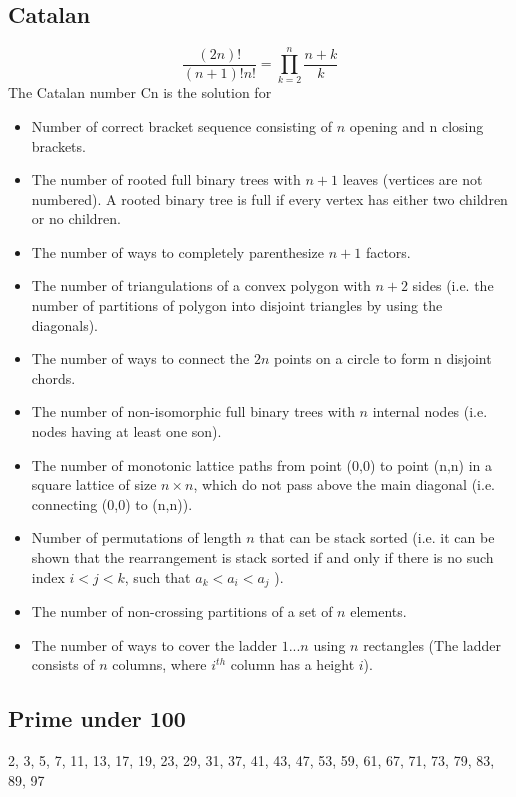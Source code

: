 \documentclass[a4paper, 12pt, oneside, landscape]{article}
\begin{document}
\begin{multicols}{2}
	\subsection{Catalan}
	\[\frac{(2n)!}{(n + 1)!n!} = \prod_{k = 2}^n \frac{n + k}{k} \]
	The Catalan number Cn is the solution for
	\begin{itemize}
	    \item Number of correct bracket sequence consisting of $n$ opening and n closing brackets.
	    \item The number of rooted full binary trees with $n+1$ leaves (vertices are not numbered). A rooted binary tree is full if every vertex has either two children or no children.
	    \item The number of ways to completely parenthesize $n+1$ factors.
	    \item The number of triangulations of a convex polygon with $n+2$ sides (i.e. the number of partitions of polygon into disjoint triangles by using the diagonals).
	    \item The number of ways to connect the $2n$ points on a circle to form n disjoint chords.
	    \item The number of non-isomorphic full binary trees with $n$ internal nodes (i.e. nodes having at least one son).
	    \item The number of monotonic lattice paths from point (0,0) to point (n,n) in a square lattice of size $n \times n$, which do not pass above the main diagonal (i.e. connecting (0,0) to (n,n)).
	    \item Number of permutations of length $n$ that can be stack sorted (i.e. it can be shown that the rearrangement is stack sorted if and only if there is no such index $i<j<k$, such that $a_k<a_i<a_j$ ).
	    \item The number of non-crossing partitions of a set of $n$ elements.
        \item The number of ways to cover the ladder $1...n$ using $n$ rectangles (The ladder consists of $n$ columns, where $i^{th}$ column has a height $i$).
	\end{itemize}

	\subsection{Prime under 100}
	2, 3, 5, 7, 11, 13, 17, 19, 23, 29, 31, 37, 41, 43, 47, 53, 59, 61, 67, 71, 73, 79, 83, 89, 97 
	

\end{multicols}
\end{document}

